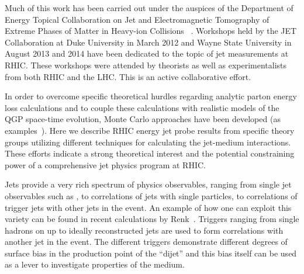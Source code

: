 Much of this work has been carried out under the auspices of the
Department of Energy Topical Collaboration on Jet and Electromagnetic
Tomography of Extreme Phases of Matter in Heavy-ion Collisions
~\cite{jetcollaboration}.  Workshops held by the JET Collaboration at
Duke University in March 2012 and Wayne State University in August
2013 and 2014 have been dedicated to the topic of jet measurements at RHIC.
These workshops were attended by theorists as well as experimentalists
from both RHIC and the LHC.  This is an active collaborative effort.

In order to overcome specific theoretical hurdles regarding analytic
parton energy loss calculations and to couple these calculations with
realistic models of the QGP space-time evolution, Monte Carlo
approaches have been developed (as
examples~\cite{Zapp:2009pu,Renk:2010zx,Young:2011va,ColemanSmith:2011wd,Lokhtin:2011qq,Armesto:2009zc}).
Here we describe RHIC energy jet probe results from specific theory
groups utilizing different techniques for calculating the jet-medium
interactions.  These efforts indicate a strong theoretical interest
and the potential constraining power of a comprehensive jet physics
program at RHIC.

Jets provide a very rich spectrum of physics observables, ranging from
single jet observables such as \raa, to correlations of jets with
single particles, to correlations of trigger jets with other jets in
the event.  An example of how one can exploit this variety can be
found in recent calculations by Renk~\cite{Renk:2012ve}.
Triggers ranging from single hadrons on up to ideally
reconstructed jets are used to form correlations with another jet in
the event.  The different triggers demonstrate different degrees of
surface bias in the production point of the ``dijet'' and this bias
itself can be used as a lever to investigate properties of the medium.


